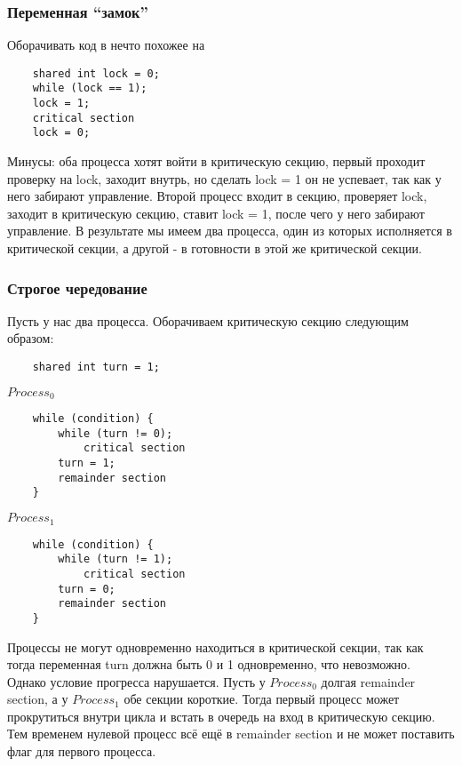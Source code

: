 \documentclass[12pt, a4paper]{article}
\begin{document}
    \subsubsection*{Переменная ``замок''}
    Оборачивать код в нечто похожее на
    \begin{lstlisting}
    shared int lock = 0;
    while (lock == 1);
    lock = 1;
    critical section
    lock = 0;
    \end{lstlisting}
    Минусы: оба процесса хотят войти в критическую секцию, первый проходит проверку на lock, заходит внутрь, но сделать lock = 1 он не успевает, так как у него забирают управление. Второй процесс входит в секцию, проверяет lock, заходит в критическую секцию, ставит lock = 1, после чего у него забирают управление. В результате мы имеем два процесса, один из которых исполняется в критической секции, а другой - в готовности в этой же критической секции.
    \subsubsection*{Строгое чередование}
    Пусть у нас два процесса. Оборачиваем критическую секцию следующим образом:\\
    \begin{lstlisting}    
    shared int turn = 1;
    \end{lstlisting}
    $Process_0$
    \begin{lstlisting}
    while (condition) {
        while (turn != 0);
            critical section
        turn = 1;
        remainder section
    }
    \end{lstlisting}
    $Process_1$
    \begin{lstlisting}
    while (condition) {
        while (turn != 1);
            critical section
        turn = 0;
        remainder section
    }
    \end{lstlisting}
    Процессы не могут одновременно находиться в критической секции, так как тогда переменная turn должна быть 0 и 1 одновременно, что невозможно.\\
    Однако условие прогресса нарушается. Пусть у $Process_0$ долгая remainder section, а у $Process_1$ обе секции короткие. Тогда первый процесс может прокрутиться внутри цикла и встать в очередь на вход в критическую секцию. Тем временем нулевой процесс всё ещё в remainder section и не может поставить флаг для первого процесса.
\end{document}
